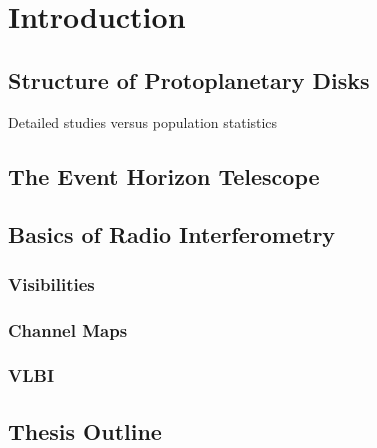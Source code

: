 \chapter{Introduction}\label{chapter:introduction}

\section{Structure of Protoplanetary Disks}

Detailed studies versus population statistics

\citep{harris14}

\section{The Event Horizon Telescope}

\section{Basics of Radio Interferometry}
\subsection{Visibilities}
\subsection{Channel Maps}
\subsection{VLBI}

\section{Thesis Outline}

